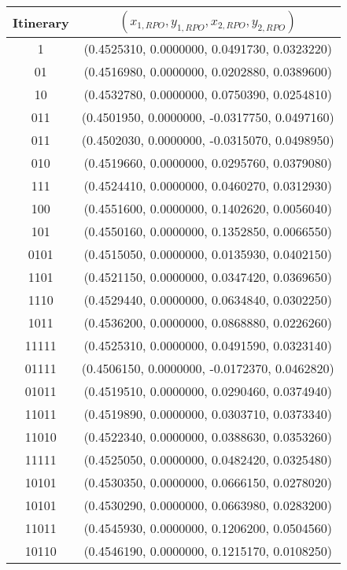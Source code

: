 \begin{table}
	\begin{tabular}{c|c}
	Itinerary & $(x_{1,RPO}, y_{1,RPO}, x_{2,RPO}, y_{2,RPO})$ \\ 
	\hline
	1  & (0.4525310, 0.0000000, 0.0491730, 0.0323220) \\ 
 	\hline
	01  & (0.4516980, 0.0000000, 0.0202880, 0.0389600) \\ 
 	\hline
	10  & (0.4532780, 0.0000000, 0.0750390, 0.0254810) \\ 
 	\hline
	011  & (0.4501950, 0.0000000, -0.0317750, 0.0497160) \\ 
 	\hline
	011  & (0.4502030, 0.0000000, -0.0315070, 0.0498950) \\ 
 	\hline
	010  & (0.4519660, 0.0000000, 0.0295760, 0.0379080) \\ 
 	\hline
	111  & (0.4524410, 0.0000000, 0.0460270, 0.0312930) \\ 
 	\hline
	100  & (0.4551600, 0.0000000, 0.1402620, 0.0056040) \\ 
 	\hline
	101  & (0.4550160, 0.0000000, 0.1352850, 0.0066550) \\ 
 	\hline
	0101  & (0.4515050, 0.0000000, 0.0135930, 0.0402150) \\ 
 	\hline
	1101  & (0.4521150, 0.0000000, 0.0347420, 0.0369650) \\ 
 	\hline
	1110  & (0.4529440, 0.0000000, 0.0634840, 0.0302250) \\ 
 	\hline
	1011  & (0.4536200, 0.0000000, 0.0868880, 0.0226260) \\ 
 	\hline
	11111  & (0.4525310, 0.0000000, 0.0491590, 0.0323140) \\ 
 	\hline
	01111  & (0.4506150, 0.0000000, -0.0172370, 0.0462820) \\ 
 	\hline
	01011  & (0.4519510, 0.0000000, 0.0290460, 0.0374940) \\ 
 	\hline
	11011  & (0.4519890, 0.0000000, 0.0303710, 0.0373340) \\ 
 	\hline
	11010  & (0.4522340, 0.0000000, 0.0388630, 0.0353260) \\ 
 	\hline
	11111  & (0.4525050, 0.0000000, 0.0482420, 0.0325480) \\ 
 	\hline
	10101  & (0.4530350, 0.0000000, 0.0666150, 0.0278020) \\ 
 	\hline
	10101  & (0.4530290, 0.0000000, 0.0663980, 0.0283200) \\ 
 	\hline
	11011  & (0.4545930, 0.0000000, 0.1206200, 0.0504560) \\ 
 	\hline
	10110  & (0.4546190, 0.0000000, 0.1215170, 0.0108250) \\ 

\end{tabular}
\end{table}
